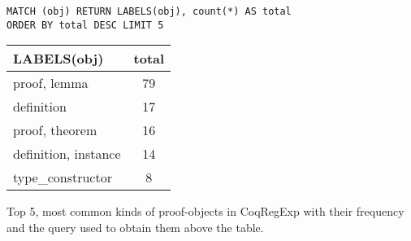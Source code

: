 \begin{verbatim}
MATCH (obj) RETURN LABELS(obj), count(*) AS total
ORDER BY total DESC LIMIT 5
\end{verbatim}

\centering

\begin{tabular*}{\textwidth}{@{\extracolsep{\fill}} lc}

  \toprule
  \textbf{LABELS(obj)} & \textbf{total} \\

  \midrule

  proof, lemma         & 79 \\
  definition           & 17 \\
  proof, theorem       & 16 \\
  definition, instance & 14 \\
  type\_constructor    & 8 \\

  \bottomrule

\end{tabular*}

\bigskip
\caption{Top 5, most common kinds of proof-objects in CoqRegExp with their
  frequency and the query used to obtain them above the
  table.}\label{table:regexp:kinds}
